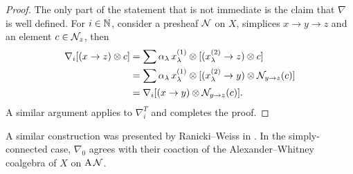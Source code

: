 \begin{proof}
	The only part of the statement that is not immediate is the claim that $\nabla$ is well defined.
	For $i \in \mathbb{N}$, consider a presheaf $\mathcal{N}$ on $X$, simplices $x \to y \to z$ and an element $c \in \mathcal{N}_z$, then
	\begin{align*}
		\nabla_i [(x \to z) \otimes c] &=
		\sum \alpha_\lambda \, x^{(1)}_\lambda \otimes {[(x^{(2)}_\lambda \to z) \otimes c]} \\ &=
		\sum \alpha_\lambda \, x^{(1)}_\lambda \otimes [(x^{(2)}_\lambda \to y) \otimes \mathcal{N}_{y \to z}(c)] \\ &=
		\nabla_i [(x \to y) \otimes \mathcal{N}_{y \to z}(c)].
	\end{align*}
	A similar argument applies to $\nabla^T_i$ and completes the proof.
\end{proof}

A similar construction was presented by Ranicki--Weiss in \cite[Proposition~5.3]{ranicki1990assembly}.
In the simply-connected case, $\nabla_0$ agrees with their coaction of the Alexander--Whitney coalgebra of $X$ on $\operatorname{A} \mathcal{N}$.